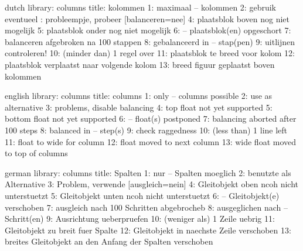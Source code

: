 

\unprotect



\startmessages  dutch  library: columns 
  title: kolommen
      1: maximaal -- kolommen
      2: gebruik eventueel \string{}: probleempje, probeer [balanceren=nee]
      4: plaatsblok boven nog niet mogelijk
      5: plaatsblok onder nog niet mogelijk
      6: -- plaatsblok(en) opgeschort
      7: balanceren afgebroken na 100 stappen
      8: gebalanceerd in -- stap(pen)
      9: uitlijnen controleren!
     10: (minder dan) 1 regel over
     11: plaatsblok te breed voor kolom
     12: plaatsblok verplaatst naar volgende kolom
     13: breed figuur geplaatst boven kolommen
\stopmessages

\startmessages  english  library: columns
  title: columns
      1: only -- columns possible
      2: use \string\filbreak\space as alternative
      3: problems, disable balancing 
      4: top float not yet supported 
      5: bottom float not yet supported 
      6: -- float(s) postponed
      7: balancing aborted after 100 steps 
      8: balanced in -- step(s)
      9: check raggedness 
     10: (less than) 1 line left 
     11: float to wide for column 
     12: float moved to next column 
     13: wide float moved to top of columns
\stopmessages

\startmessages  german  library: columns
  title: Spalten
      1: nur -- Spalten moeglich
      2: benutzte \string\filbreak\space als Alternative
      3: Problem, verwende [ausgleich=nein]
      4: Gleitobjekt oben ncoh nicht unterstuetzt
      5: Gleitobjekt unten ncoh nicht unterstuetzt
      6: -- Gleitobjekt(e) verschoben
      7: ausgleich nach 100 Schritten abgebrocheb 
      8: ausgeglichen nach  -- Schritt(en)
      9: Ausrichtung ueberpruefen
     10: (weniger als) 1 Zeile uebrig
     11: Gleitobjekt zu breit fuer Spalte 
     12: Gleitobjekt in naechste Zeile verschoben 
     13: breites Gleitobjekt an den Anfang der Spalten verschoben
\stopmessages

